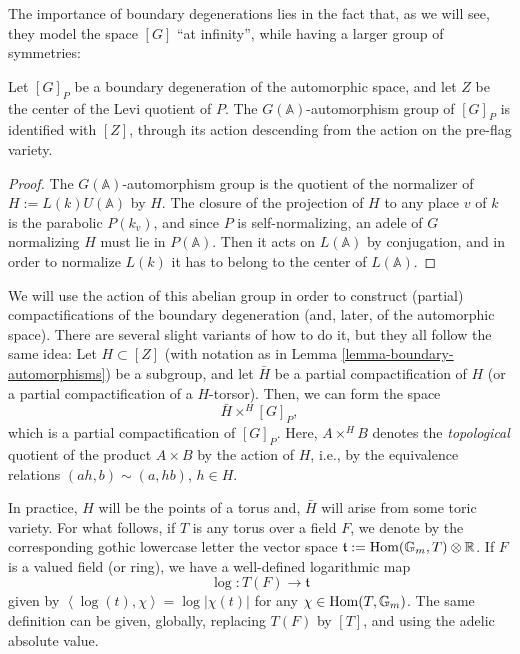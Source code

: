 The importance of boundary degenerations lies in the fact that, as we will see, they model the space $[G]$ ``at infinity'', while having a larger group of symmetries:

\begin{lemma}
 \label{lemma-boundary-automorphisms}
Let $[G]_P$ be a boundary degeneration of the automorphic space, and let $Z$ be the center of the Levi quotient of $P$. The $G(\mathbb A)$-automorphism group of $[G]_P$ is identified with $[Z]$, through its action descending from the action on the pre-flag variety.
\end{lemma}

\begin{proof}
 The $G(\mathbb A)$-automorphism group is the quotient of the normalizer of $H:=L(k)U(\mathbb A)$ by $H$. The closure of the projection of $H$ to any place $v$ of $k$ is the parabolic $P(k_v)$, and since $P$ is self-normalizing, an adele of $G$ normalizing $H$ must lie in $P(\mathbb A)$. Then it acts on $L(\mathbb A)$ by conjugation, and in order to normalize $L(k)$ it has to belong to the center of $L(\mathbb A)$. 
\end{proof}


We will use the action of this abelian group in order to construct (partial) compactifications of the boundary degeneration (and, later, of the automorphic space). There are several slight variants of how to do it, but they all follow the same idea: Let $H\subset [Z]$ (with notation as in Lemma \ref{lemma-boundary-automorphisms}) be a subgroup, and let $\bar H$ be a partial compactification of $H$ (or a partial compactification of a $H$-torsor). Then, we can form the space 
$$\bar H \times^H [G]_P,$$
which is a partial compactification of $[G]_P$. Here, $A\times^H B$ denotes the \emph{topological} quotient of the product $A\times B$ by the action of $H$, i.e., by the equivalence relations $(ah,b) \sim (a, hb)$, $h\in H$.

In practice, $H$ will be the points of a torus and, $\bar H$ will arise from some toric variety. 
For what follows, if $T$ is any torus over a field $F$, we denote by the corresponding gothic lowercase letter the vector space $\mathfrak t:= \mathop{\rm Hom}\nolimits(\mathbb G_m, T) \otimes \mathbb R$. If $F$ is a valued field (or ring), we have a well-defined logarithmic map
\begin{equation}
\label{equation-logmap}
\log: T(F)\to \mathfrak t
\end{equation}
given by $\left<\log(t), \chi\right> = \log|\chi(t)|$ for any $\chi\in \mathop{\rm Hom}\nolimits(T,\mathbb G_m)$. The same definition can be given, globally, replacing $T(F)$ by $[T]$, and using the adelic absolute value.

